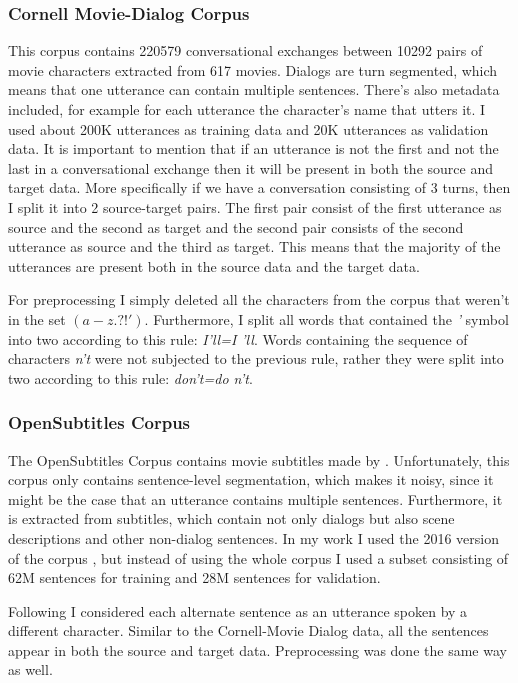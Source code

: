 \documentclass[12pt]{article}
\begin{document}
\subsubsection{Cornell Movie-Dialog Corpus} \label{sssec:cornell}
This corpus contains 220579 conversational exchanges between 10292 pairs of movie characters extracted from 617 movies. Dialogs are turn segmented, which means that one utterance can contain multiple sentences. There's also metadata included, for example for each utterance the character's name that utters it. I used about 200K utterances as training data and 20K utterances as validation data. It is important to mention that if an utterance is not the first and not the last in a conversational exchange then it will be present in both the source and target data. More specifically if we have a conversation consisting of 3 turns, then I split it into 2 source-target pairs. The first pair consist of the first utterance as source and the second as target and the second pair consists of the second utterance as source and the third as target. This means that the majority of the utterances are present both in the source data and the target data.

For preprocessing I simply deleted all the characters from the corpus that weren't in the set \((a-z . ? ! ')\). Furthermore, I split all words that contained the \textit{'} symbol into two according to this rule: \textit{I'll=I 'll}. Words containing the sequence of characters \textit{n't} were not subjected to the previous rule, rather they were split into two according to this rule: \textit{don't=do n't}.

\subsubsection{OpenSubtitles Corpus} \label{sssec:opensubs}
The OpenSubtitles Corpus contains movie subtitles made by \cite{opensubtitles}. Unfortunately, this corpus only contains sentence-level segmentation, which makes it noisy, since it might be the case that an utterance contains multiple sentences. Furthermore, it is extracted from subtitles, which contain not only dialogs but also scene descriptions and other non-dialog sentences. In my work I used the 2016 version of the corpus \cite{OpenSubtitles:2016}, but instead of using the whole corpus I used a subset consisting of 62M sentences for training and 28M sentences for validation.

Following \cite{Vinyals:2015} I considered each alternate sentence as an utterance spoken by a different character. Similar to the Cornell-Movie Dialog data, all the sentences appear in both the source and target data. Preprocessing was done the same way as well.
\end{document}
